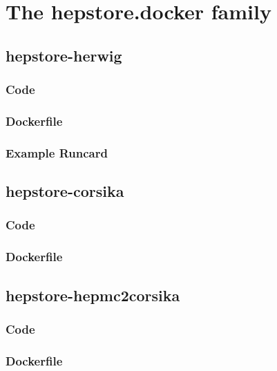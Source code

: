 





  \section{The hepstore.docker family}
  \label{app:docker}

  \subsection{hepstore-herwig}

  \subsubsection{Code}
  \begin{changemargin}{1.5cm}{1.5cm} 
    
  \end{changemargin}

  \subsubsection{Dockerfile}
  \begin{changemargin}{1.5cm}{1.5cm} 
    
  \end{changemargin}

  \subsubsection{Example Runcard}
  \begin{changemargin}{1.5cm}{1.5cm} 
    
  \end{changemargin}
  
  \subsection{hepstore-corsika}

  \subsubsection{Code}

  \subsubsection{Dockerfile}
  
  \subsection{hepstore-hepmc2corsika}

  \subsubsection{Code}

  \subsubsection{Dockerfile}
